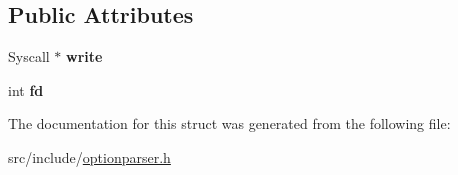 \subsection*{Public Attributes}
\begin{DoxyCompactItemize}
\item 
\hypertarget{structxmem_1_1config_1_1third__party_1_1_print_usage_implementation_1_1_syscall_writer_a437e8105a1e0b45e514246caed539664}{}Syscall $\ast$ {\bfseries write}\label{structxmem_1_1config_1_1third__party_1_1_print_usage_implementation_1_1_syscall_writer_a437e8105a1e0b45e514246caed539664}

\item 
\hypertarget{structxmem_1_1config_1_1third__party_1_1_print_usage_implementation_1_1_syscall_writer_a9652df23c84135075bb5468bb39a7064}{}int {\bfseries fd}\label{structxmem_1_1config_1_1third__party_1_1_print_usage_implementation_1_1_syscall_writer_a9652df23c84135075bb5468bb39a7064}

\end{DoxyCompactItemize}


The documentation for this struct was generated from the following file\+:\begin{DoxyCompactItemize}
\item 
src/include/\hyperlink{optionparser_8h}{optionparser.\+h}\end{DoxyCompactItemize}
